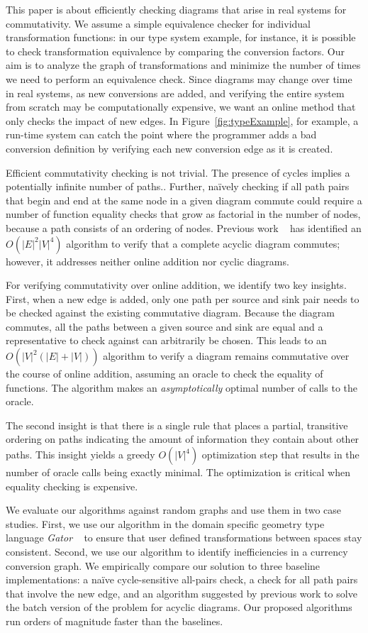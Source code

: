 \documentclass[sigplan,review,nonacm=true]{acmart}
\begin{document}
This paper is about efficiently checking diagrams that arise in real systems for commutativity.
We assume a simple equivalence checker for individual transformation functions: in our type system example, for instance, it is possible to check transformation equivalence by comparing the conversion factors.
Our aim is to analyze the graph of transformations and minimize the number of times we need to perform an equivalence check.
Since diagrams may change over time in real systems, as new conversions are added, and verifying the entire system from scratch may be computationally expensive, we want an online method that only checks the impact of new edges.
In Figure~\ref{fig:typeExample}, for example, a run-time system can catch the point where the programmer adds a bad conversion definition by verifying each new conversion edge as it is created.

Efficient commutativity checking is not trivial.
The presence of cycles implies a potentially infinite number of paths..
Further, na\"{i}vely checking if all path pairs that begin and end at the same node in a given diagram commute could require a number of function equality checks that grow as factorial in the number of nodes, because a path consists of an ordering of nodes.
Previous work ~\cite{commutative} has identified an $O(|E|^2|V|^4)$ algorithm to verify that a complete acyclic diagram commutes; however, it addresses neither online addition nor cyclic diagrams.

For verifying commutativity over online addition, we identify two key insights.
First, when a new edge is added,
only one path per source and sink pair needs to be checked against the existing commutative diagram.
Because the diagram commutes, all the paths between a given source and sink are equal and a representative to check against can arbitrarily be chosen.
This leads to an $O(|V|^2(|E|+|V|))$ algorithm to verify a diagram remains commutative over the course of online addition, assuming an oracle to check the equality of functions.
The algorithm makes an \emph{asymptotically} optimal number of calls to the oracle.

The second insight is that there is a single rule that places a partial, transitive ordering on paths indicating the amount of information they contain about other paths.
This insight yields a greedy $O(|V|^4)$ optimization step that results in the number of oracle calls being exactly minimal.
The optimization is critical when equality checking is expensive.

We evaluate our algorithms against random graphs and use them in two case studies.
First, we use our algorithm in the domain specific geometry type language \textit{Gator} ~\cite{gator} to ensure that user defined transformations between spaces stay consistent.
Second, we use our algorithm to identify inefficiencies in a currency conversion graph.
%
We empirically compare our solution to three baseline implementations: a na\"{i}ve cycle-sensitive all-pairs check, a check for all path pairs that involve the new edge, and an algorithm suggested by previous work to solve the batch version of the problem for acyclic diagrams.
Our proposed algorithms run orders of magnitude faster than the baselines.
\end{document}
